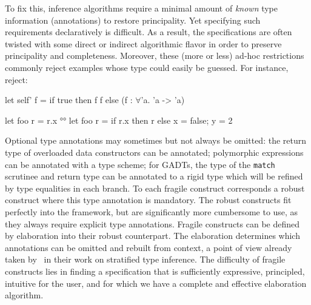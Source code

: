 \documentclass[acmsmall,screen,nonacm]{acmart}
\begin{document}
To fix this, inference algorithms require a minimal amount of \emph{known}
type information (\ie annotations) to restore principality. Yet specifying
such requirements declaratively is difficult. As a result, the specifications
are often twisted with some direct or indirect algorithmic flavor in order to
preserve principality and completeness.
%
Moreover, these (more or less) ad-hoc restrictions commonly reject examples
whose type could easily be guessed. For instance, \citep{TODO} reject:
\begin{program}[input]
  let self' f = if true then f f else (f : $\forall$'a. 'a -> 'a)
\end{program}
\begin{version}{}
\begin{program}
let foo r = r.x °°
let foo r = if r.x then r else {x = false; y = 2}
\end{program}

\end{version}


Optional type annotations may sometimes but not always be omitted: the
return type of overloaded data constructors can be annotated; polymorphic
expressions can be annotated with a type scheme; for GADTs, the type of the
\texttt{match} scrutinee and return type can be annotated to a rigid type
which will be
refined by type equalities in each branch. To each fragile construct
corresponds a robust construct where this type annotation is mandatory. The
robust constructs fit perfectly into the \ML framework, but are
significantly more cumbersome to use, as they always require explicit type
annotations.  Fragile constructs can be defined by elaboration into their
robust counterpart. The elaboration determines which annotations can be
omitted and rebuilt from context, a point of view already taken by~\citet
{Pottier-Regis-Gianas/stratified@popl06} in their work on stratified type
inference.
%
The difficulty of fragile constructs lies in finding a specification
that is sufficiently expressive, principled, intuitive for the user,
and for which we have a complete and effective elaboration algorithm.
\end{document}
